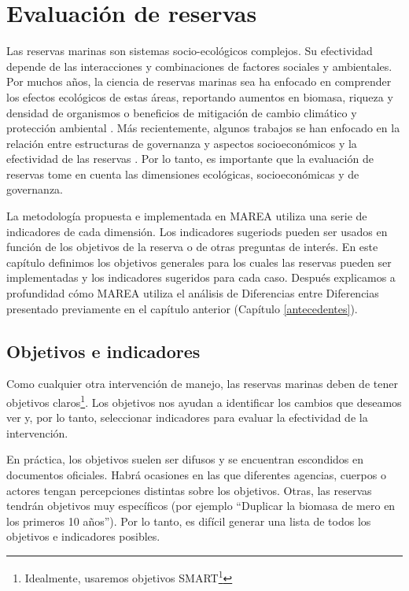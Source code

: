 \documentclass[]{krantz}
\renewcommand{\href}[2]{#2\footnote{\url{#1}}}
\begin{document}
\hypertarget{evaluacion-de-reservas}{%
\chapter{Evaluación de reservas}\label{evaluacion-de-reservas}}

Las reservas marinas son sistemas socio-ecológicos complejos. Su
efectividad depende de las interacciones y combinaciones de factores
sociales y ambientales. Por muchos años, la ciencia de reservas marinas
sea ha enfocado en comprender los efectos ecológicos de estas áreas,
reportando aumentos en biomasa, riqueza y densidad de organismos o
beneficios de mitigación de cambio climático y protección ambiental
\citep{lester_2009, micheli_2012, giakoumi_2017, sala_2017, roberts_2017}.
Más recientemente, algunos trabajos se han enfocado en la relación entre
estructuras de governanza y aspectos socioeconómicos y la efectividad de
las reservas \citep{halpern_2013, lpezangarita_2014, mascia_2017}. Por
lo tanto, es importante que la evaluación de reservas tome en cuenta las
dimensiones ecológicas, socioeconómicas y de governanza.

La metodología propuesta e implementada en MAREA utiliza una serie de
indicadores de cada dimensión. Los indicadores sugeriods pueden ser
usados en función de los objetivos de la reserva o de otras preguntas de
interés. En este capítulo definimos los objetivos generales para los
cuales las reservas pueden ser implementadas y los indicadores sugeridos
para cada caso. Después explicamos a profundidad cómo MAREA utiliza el
análisis de Diferencias entre Diferencias presentado previamente en el
capítulo anterior (Capítulo \ref{antecedentes}).

\hypertarget{objetivos-e-indicadores}{%
\section{Objetivos e indicadores}\label{objetivos-e-indicadores}}

Como cualquier otra intervención de manejo, las reservas marinas deben
de tener objetivos claros\footnote{Idealmente, usaremos objetivos
  \href{https://en.wikipedia.org/wiki/SMART_criteria}{SMART}}. Los
objetivos nos ayudan a identificar los cambios que deseamos ver y, por
lo tanto, seleccionar indicadores para evaluar la efectividad de la
intervención.

En práctica, los objetivos suelen ser difusos y se encuentran escondidos
en documentos oficiales. Habrá ocasiones en las que diferentes agencias,
cuerpos o actores tengan percepciones distintas sobre los objetivos.
Otras, las reservas tendrán objetivos muy específicos (por ejemplo
``Duplicar la biomasa de mero en los primeros 10 años''). Por lo tanto,
es difícil generar una lista de todos los objetivos e indicadores
posibles.
\end{document}
